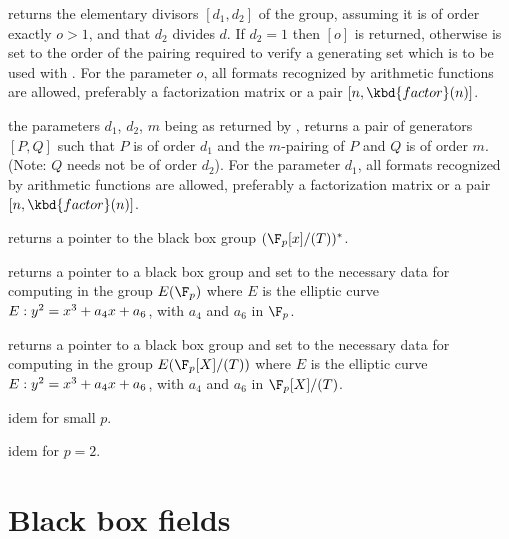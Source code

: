 returns the elementary divisors $[d_1, d_2]$ of the group, assuming it is of
order exactly $o>1$, and that $d_2$ divides $d$. If $d_2=1$ then $[o]$ is
returned, otherwise  is set to the order of the pairing
required to verify a generating set which is to be used with
. For the parameter $o$, all formats recognized by
arithmetic functions are allowed, preferably a factorization matrix or a pair
$[n,\kbd{factor}(n)]$.

the parameters $d_1$, $d_2$, $m$ being as returned by ,
returns a pair of generators $[P,Q]$ such that $P$ is of order $d_1$ and the
$m$-pairing of $P$ and $Q$ is of order $m$. (Note: $Q$ needs not be of order
$d_2$). For the parameter $d_1$, all formats recognized by arithmetic
functions are allowed, preferably a factorization matrix or a pair
$[n,\kbd{factor}(n)]$.



returns a pointer to the black box group $(\F_p[x]/(T))^*$.

returns a pointer to a black box group and set  to the necessary data for
computing in the group $E(\F_p)$ where $E$ is the elliptic curve $E:y^2=x^3+a_4\*x+a_6$,
with $a_4$ and $a_6$ in $\F_p$.

returns a pointer to a black box group and set  to the necessary data for
computing in the group $E(\F_p[X]/(T))$ where $E$ is the elliptic curve $E:y^2=x^3+a_4\*x+a_6$,
with $a_4$ and $a_6$ in $\F_p[X]/(T)$.

 idem for small $p$.

idem for $p=2$.

\section{Black box fields}

